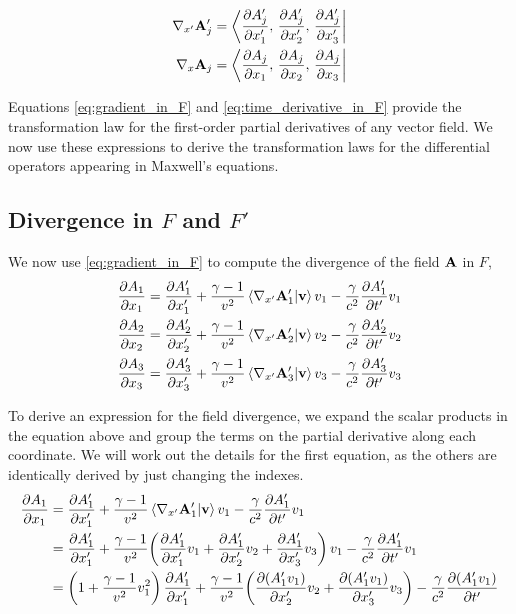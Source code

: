 \documentclass[12pt]{article}
\newcommand{\ds}{\displaystyle}
\begin{document}
\begin{align}
  \nabla_{x'}\vb{A}'_j &= \bra{\ds\pdv{A'_j}{x'_1},\, \ds\pdv{A'_j}{x'_2},\, \ds\pdv{A'_j}{x'_3}} \\
  \nabla_x \vb{A}_j    &= \bra{\ds\pdv{A_j}{x_1},\, \ds\pdv{A_j}{x_2},\, \ds\pdv{A_j}{x_3}}
\end{align}

Equations \eqref{eq:gradient_in_F} and \eqref{eq:time_derivative_in_F} provide the transformation law for the first-order
partial derivatives of any vector field.
We now use these expressions to derive the transformation laws for the differential operators appearing in Maxwell's equations.
\subsection{Divergence in $F$ and $F'$}

We now use \eqref{eq:gradient_in_F} to compute the divergence of the field $\vb{A}$ in $F$,
\begin{align}
  \pdv{A_1}{x_1} &= \pdv{A'_1}{x'_1}
    + \frac{\gamma-1}{v^2}\ip{\nabla_{x'}\vb{A}'_1}{\vb{v}}v_1
    - \frac{\gamma}{c^2}\pdv{A'_1}{t'}v_1 \\
  \pdv{A_2}{x_2} &= \pdv{A'_2}{x'_2}
    + \frac{\gamma-1}{v^2}\ip{\nabla_{x'}\vb{A}'_2}{\vb{v}}v_2
    - \frac{\gamma}{c^2}\pdv{A'_2}{t'}v_2 \\
  \pdv{A_3}{x_3} &= \pdv{A'_3}{x'_3}
    + \frac{\gamma-1}{v^2}\ip{\nabla_{x'}\vb{A}'_3}{\vb{v}}v_3
    - \frac{\gamma}{c^2}\pdv{A'_3}{t'}v_3
\end{align}

To derive an expression for the field divergence, we expand the scalar products in the
equation above and group the terms on the partial derivative along each coordinate. We will
work out the details for the first equation, as the others are identically derived by just
changing the indexes.
\[
  \begin{aligned}
    \pdv{A_1}{x_1} &= \pdv{A'_1}{x'_1}
      + \frac{\gamma-1}{v^2}\ip{\nabla_{x'}\vb{A}'_1}{\vb{v}}v_1
      - \frac{\gamma}{c^2}\pdv{A'_1}{t'}v_1 \\
    &= \pdv{A'_1}{x'_1}
      + \frac{\gamma-1}{v^2}\!\left(
          \pdv{A'_1}{x'_1}v_1 + \pdv{A'_1}{x'_2}v_2 + \pdv{A'_1}{x'_3}v_3
        \right)v_1
      - \frac{\gamma}{c^2}\pdv{A'_1}{t'}v_1 \\
    &= \left(1 + \frac{\gamma-1}{v^2}v_1^2\right)\pdv{A'_1}{x'_1}
      + \frac{\gamma-1}{v^2}\!\left(
          \pdv{(A'_1 v_1)}{x'_2}v_2 + \pdv{(A'_1 v_1)}{x'_3}v_3
        \right)
      - \frac{\gamma}{c^2}\pdv{(A'_1 v_1)}{t'}
  \end{aligned}
\]
\end{document}

